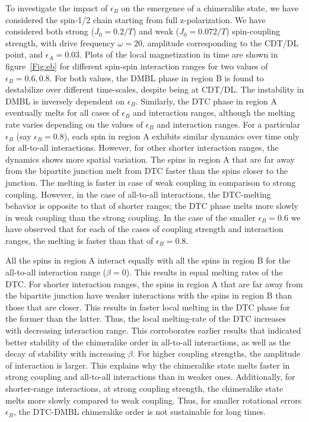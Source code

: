 \documentclass[12pt]{iopart}
\begin{document}
To investigate the impact of $\epsilon_B$ on the emergence of a chimeralike state, we have considered the spin-1/2 chain starting from full z-polarization. We have considered both strong ($J_0 = 0.2/T$) and weak ($J_0 = 0.072/T$) spin-coupling strength, with drive frequency $\omega = 20$, amplitude corresponding to the CDT/DL point, and $\epsilon_A=0.03$. Plots of the local magnetization in time are shown in figure~\ref{Fig:eb} for different spin-spin interaction ranges for two values of $\epsilon_B = 0.6, 0.8$. For both values, the DMBL phase in region B is found to destabilize over different time-scales, despite being at CDT/DL. The instability in DMBL is inversely dependent on $\epsilon_B$. Similarly, the DTC phase in region A eventually melts for all cases of $\epsilon_B$ and interaction ranges, although the melting rate varies depending on the values of $\epsilon_B$ and interaction ranges. For a particular $\epsilon_B$ (say $\epsilon_B=0.8$), each spin in region A exhibits similar dynamics over time only for all-to-all interactions. However, for other shorter interaction ranges, the dynamics shows more spatial variation. The spins in region A that are far away from the bipartite junction melt from DTC faster than the spins closer to the junction. The melting is faster in case of weak coupling in comparison to strong coupling. However, in the case of all-to-all interactions, the DTC-melting behavior is opposite to that of shorter ranges; the DTC phase melts more slowly in weak coupling than the strong coupling. In the case of the smaller $\epsilon_B=0.6$ we have observed that for each of the cases of coupling strength and interaction ranges, the melting is faster than that of $\epsilon_B=0.8$.

All the spins in region A interact equally with all the spins in region B for the all-to-all interaction range ($\beta=0$). This results in equal melting rates of the DTC. For shorter interaction ranges, the spins in region A that are far away from the bipartite junction have weaker interactions with the spins in region B than those that are closer. This results in faster local melting in the DTC phase for the former than the latter. Thus, the local melting-rate of the DTC increases with decreasing interaction range. This corroborates earlier results that indicated better stability of the chimeralike order in all-to-all interactions, as well as the decay of stability with increasing $\beta$. For higher coupling strengths, the amplitude of interaction is larger. This explains why the chimeralike state melts faster in strong coupling and all-to-all interactions than in weaker ones. Additionally, for shorter-range interactions, at strong coupling strength, the chimeralike state melts more slowly compared to weak coupling. Thus, for smaller rotational errors $\epsilon_B$, the DTC-DMBL chimeralike order is not sustainable for long times.
\end{document}
